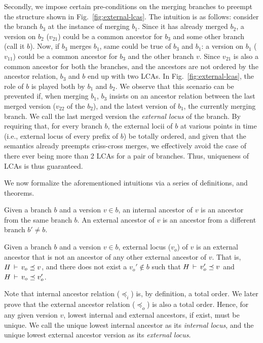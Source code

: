 Secondly, we impose certain pre-conditions on the merging branches to
preempt the structure shown in Fig.~\ref{fig:external-lcas}. The
intuition is as follows: consider the branch $b_3$ at the instance of
merging $b_1$. Since it has already merged $b_2$, a version on $b_2$
($v_{21}$) could be a common ancestor for $b_3$ and some other branch
(call it $b$). Now, if $b_3$ merges $b_1$, same could be true of $b_3$
and $b_1$: a version on $b_1$ ($v_{11}$) could be a common ancestor
for $b_3$ and the other branch $v$. Since $v_{21}$ is also a common
ancestor for both the branches, and the ancestors are not ordered by
the ancestor relation, $b_3$ and $b$ end up with two LCAs. In
Fig.~\ref{fig:external-lcas}, the role of $b$ is played both by $b_1$
and $b_2$. We observe that this scenario can be prevented if, when
merging $b_1$, $b_3$ insists on an ancestor relation between the last
merged version ($v_{22}$ of the $b_2$), and the latest version of
$b_1$, the currently merging branch. We call the last merged version
the \emph{external locus} of the branch. By requiring that, for every
branch $b$, the external locii of $b$ at various points in time (i.e.,
external locus of every prefix of $b$) be totally ordered, and given
that the semantics already preempts criss-cross merges, we effectively
avoid the case of there ever being more than 2 LCAs for a pair of
branches. Thus, uniqueness of LCAs is thus guaranteed.

We now formalize the aforementioned intuitions via a series of
definitions, and theorems.

\begin{definition} 
Given a branch $b$ and a version $v\in b$, an internal ancestor of $v$
is an ancestor from the same branch $b$. An external ancestor of $v$
is an ancestor from a different branch $b'\neq b$.
\end{definition}

\begin{definition} 
Given a branch $b$ and a version $v\in b$, external locus ($v_o$) of
$v$ is an external ancestor that is not an ancestor of any other
external ancestor of $v$. That is, $H\,\vdash\,v_o \preceq v$, and
there does not exist a $v_o' \not\in b$ such that $H\,\vdash\,v_o'
\preceq v$ and $H\,\vdash\,v_o \preceq v_o'$.
\end{definition}

Note that internal ancestor relation ($\preceq_i$) is, by definition,
a total order. We later prove that the external ancestor relation
($\preceq_o$) is also a total order. Hence, for any given version $v$,
lowest internal and external ancestors, if exist, must be unique.  We
call the unique lowest internal ancestor as its \emph{internal locus},
and the unique lowest external ancestor version as its \emph{external
locus}.

